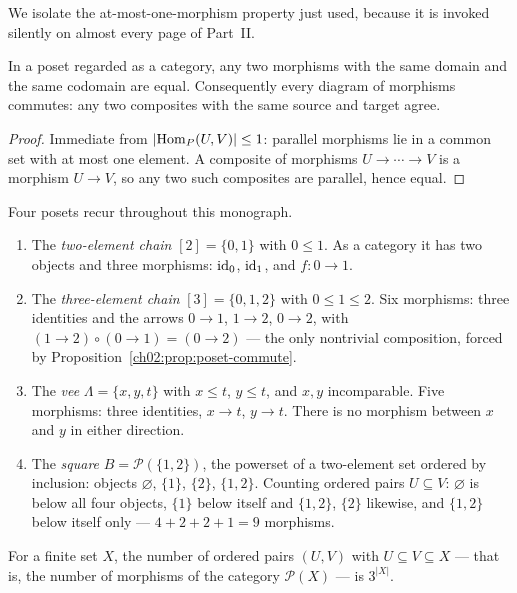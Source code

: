 We isolate the at-most-one-morphism property just used, because it
is invoked silently on almost every page of Part~II.

\begin{proposition}\label{ch02:prop:poset-commute}
In a poset regarded as a category, any two morphisms with the same domain
and the same codomain are equal. Consequently every diagram of morphisms
commutes: any two composites with the same source and target agree.
\end{proposition}

\begin{proof}
Immediate from $|\mathrm{Hom}_P(U,V)| \le 1$: parallel morphisms lie in a common
set with at most one element. A composite of morphisms $U \to \cdots \to
V$ is a morphism $U \to V$, so any two such composites are parallel, hence
equal.
\end{proof}

\begin{example}\label{ch02:ex:small-posets}
Four posets recur throughout this monograph.
\begin{enumerate}
\item The \emph{two-element chain} $[2] = \{0, 1\}$ with $0 \le 1$. As a
category it has two objects and three morphisms: $\mathrm{id}_0$, $\mathrm{id}_1$, and
$f : 0 \to 1$.
\item The \emph{three-element chain} $[3] = \{0, 1, 2\}$ with
$0 \le 1 \le 2$. Six morphisms: three identities and the arrows
$0 \to 1$, $1 \to 2$, $0 \to 2$, with $(1 \to 2) \circ (0 \to 1) =
(0 \to 2)$ --- the only nontrivial composition, forced by
Proposition~\ref{ch02:prop:poset-commute}.
\item The \emph{vee} $\Lambda = \{x, y, t\}$ with $x \le t$, $y \le t$,
and $x, y$ incomparable. Five morphisms: three identities, $x \to t$,
$y \to t$. There is no morphism between $x$ and $y$ in either direction.
\item The \emph{square} $B = \mathcal{P}(\{1, 2\})$, the powerset of a
two-element set ordered by inclusion: objects $\varnothing$, $\{1\}$,
$\{2\}$, $\{1,2\}$. Counting ordered pairs $U \subseteq V$:
$\varnothing$ is below all four objects, $\{1\}$ below itself and
$\{1,2\}$, $\{2\}$ likewise, and $\{1,2\}$ below itself only ---
$4 + 2 + 2 + 1 = 9$ morphisms.
\end{enumerate}
\end{example}

\begin{proposition}\label{ch02:prop:threepow}
For a finite set $X$, the number of ordered pairs $(U, V)$ with
$U \subseteq V \subseteq X$ --- that is, the number of morphisms of the
category $\mathcal{P}(X)$ --- is $3^{|X|}$.
\end{proposition}

